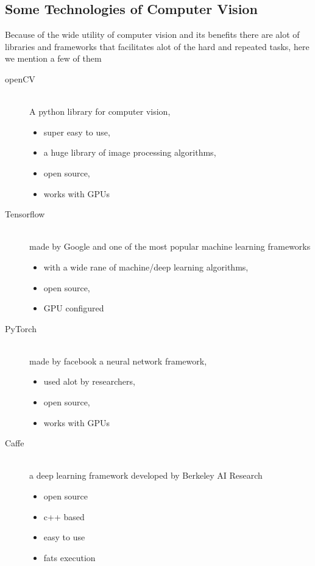     \subsection{Some Technologies of Computer Vision}
        Because of the wide utility of computer vision and its benefits there are alot of libraries and frameworks that facilitates alot of the hard and repeated tasks, here we mention a few of them  ~\cite{mldlcv}
        \begin{description}
        \item[openCV] \hfill \\ 
            A python library for computer vision,
            \begin{itemize}
                \item super easy to use, 
                \item a huge library of image processing algorithms, 
                \item open source, 
                \item works with GPUs
            \end{itemize}
        \item[Tensorflow] \hfill \\
            made by Google and one of the most popular machine learning frameworks 
            \begin{itemize}
                \item with a wide rane of machine/deep learning algorithms, 
                \item open source, 
                \item GPU configured
            \end{itemize}  
        \item[PyTorch] \hfill \\
            made by facebook a neural network framework, 
            \begin{itemize}
                \item used alot by researchers, 
                \item open source, 
                \item works with GPUs
            \end{itemize}
        \item[Caffe] \hfill \\
            a deep learning framework developed by Berkeley AI Research
            \begin{itemize}
                \item open source
                \item c++ based 
                \item easy to use
                \item fats execution 
            \end{itemize}
        \end{description}
